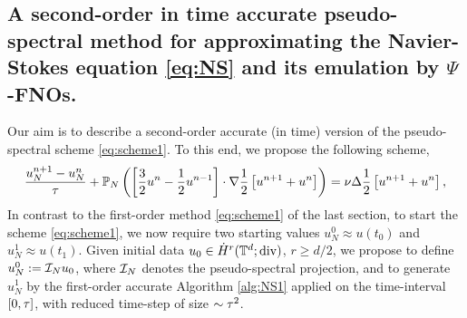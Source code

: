 \documentclass[reqno,a4paper]{amsart}
\begin{document}
\subsection{A second-order in time accurate pseudo-spectral method for approximating the Navier-Stokes equation {\eqref{eq:NS}} and its emulation by {$\Psi$}-FNOs.}
\label{app:scheme2}
Our aim is to describe a second-order accurate (in time) version of the pseudo-spectral scheme \eqref{eq:scheme1}. To this end, we propose the following scheme,
\begin{gather} \label{eq:scheme2}
\begin{gathered}
\frac{u^{n+1}_N - u^n_N}{{\tau}}
+
\mathbb{P}_N\left(
\left[
\frac32 u^n - \frac12 u^{n-1} 
\right]
\cdot
\nabla \frac12\left[
 u^{n+1} + u^{n}
\right]
\right)
=
\nu \Delta \frac 12 
\left[
u^{n+1} + u^n
\right],
\end{gathered}
\end{gather}
In contrast to the first-order method \eqref{eq:scheme1} of the last section, to start the scheme \eqref{eq:scheme1}, we now require two starting values $u^0_N \approx u(t_0)$ and $u^1_N \approx u(t_1)$. Given initial data $u_0 \in \dot{H}^r(\mathbb{T}^d;{\mathrm{div}})$, $r\ge d/2$, we propose to define $u^0_N := \mathcal{I}_N u_0$, where $\mathcal{I}_N$ denotes the pseudo-spectral projection, and to generate $u^1_N$ by the first-order accurate Algorithm \ref{alg:NS1} applied on the time-interval $[0,{\tau}]$, with reduced time-step of size $\sim {\tau}^2$.
\end{document}
